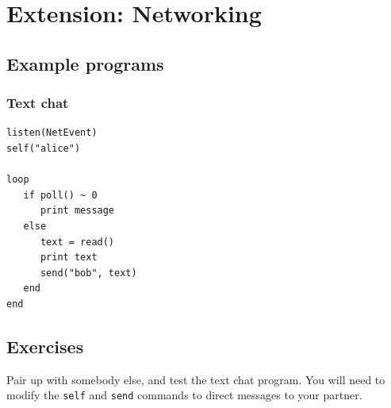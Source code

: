 \documentclass[12pt,a4paper,twoside]{article}
\renewcommand{\_}{\texttt{\symbol{95}}}
\begin{document}
\section{Extension: Networking}\label{sec:networking}

\subsection{Example programs}

\subsubsection*{Text chat}

\begin{verbatim}
listen(NetEvent)
self("alice")

loop
   if poll() ~ 0
      print message
   else
      text = read()
      print text
      send("bob", text)
   end
end
\end{verbatim}

\subsection{Exercises}

\begin{numericlist}
\item Pair up with somebody else, and test the text chat program.
	You will need to modify the \texttt{self} and \texttt{send}
	commands to direct messages to your partner.
\end{numericlist}
\end{document}
